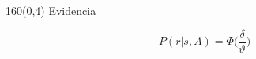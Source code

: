 \documentclass[shownotes,aspectratio=169]{beamer}
\begin{document}
\begin{frame}[plain]
\begin{textblock}{160}(0,4)
 \centering \Large Evidencia
\end{textblock}

\begin{equation*}
P(r| s, A) = \Phi \Big(\frac{\delta}{\vartheta} \Big)
\end{equation*}

\end{frame}
% 
% 
% 
% 
% 
% 
\end{document}
